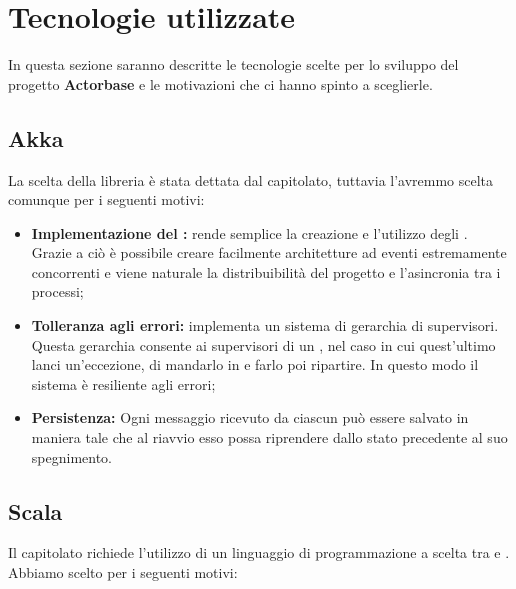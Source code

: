 \documentclass{scalatekids-article}
\begin{document}
\section{Tecnologie utilizzate}

In questa sezione saranno descritte le tecnologie scelte per lo sviluppo del
progetto \textbf{Actorbase} e le motivazioni che ci hanno spinto a sceglierle.

\subsection{Akka}

La scelta della libreria  è stata dettata dal capitolato, tuttavia
l'avremmo scelta comunque per i seguenti motivi:
\begin{itemize}
\item\textbf{Implementazione del :} 
  rende semplice la creazione e l'utilizzo degli . Grazie a ciò è
  possibile creare facilmente architetture ad eventi estremamente concorrenti e
  viene naturale la distribuibilità del progetto e l'asincronia tra i processi;
\item\textbf{Tolleranza agli errori:}  implementa un sistema di
  gerarchia di supervisori. Questa gerarchia consente ai supervisori di un
  , nel caso in cui quest'ultimo lanci un'eccezione, di mandarlo
  in  e farlo poi ripartire. In questo modo il sistema è resiliente
  agli errori;
\item\textbf{Persistenza:} Ogni messaggio ricevuto da ciascun 
  può essere salvato in maniera tale che al riavvio esso possa riprendere dallo
  stato precedente al suo spegnimento.
\end{itemize}

\subsection{Scala}

Il capitolato richiede l'utilizzo di un linguaggio di programmazione a scelta
tra  e . Abbiamo scelto  per i seguenti
motivi:
\end{document}
